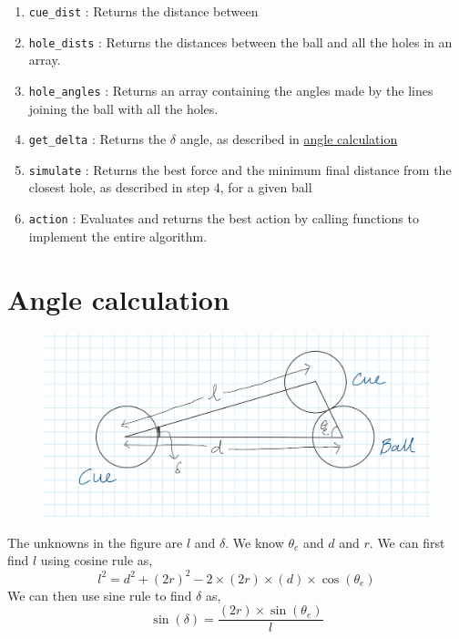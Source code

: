 \documentclass[11pt]{article}
\begin{document}
\begin{enumerate}
    \item \texttt{cue\_dist} : Returns the distance between 
    \item \texttt{hole\_dists} : Returns the distances between 
    the ball and all the holes in an array. 
    \item \texttt{hole\_angles} : Returns an array containing the angles made by the lines joining the ball 
    with all the holes. 
    \item \texttt{get\_delta} : Returns the $\delta$ angle, as described in \hyperref[sec:Angle_calculation]{angle calculation}
    \item \texttt{simulate} : Returns the best force and the minimum final distance from the closest hole, as described in step 4, for a given ball
    \item \texttt{action} : Evaluates and returns the best action by calling functions to implement 
    the entire algorithm.
\end{enumerate}

\section*{Angle calculation}
\label{sec:Angle_calculation}

\begin{figure}[H]
    \begin{center} 
        \includegraphics[width=1\textwidth]{screenshot.jpeg}
        \caption*{}
    \end{center}
 \end{figure}
The unknowns in the figure are $l$ and $\delta$. We know $\theta_e$ and $d$ and $r$. 
We can first find $l$ using cosine rule as,
$$ l^2 = d^2 + (2r)^2 - 2 \times(2r) \times(d) \times\cos(\theta_e)$$
We can then use sine rule to find $\delta$ as, 
        $$\sin(\delta) = \frac{(2r)\times \sin(\theta_e)}{l}$$
\end{document}
